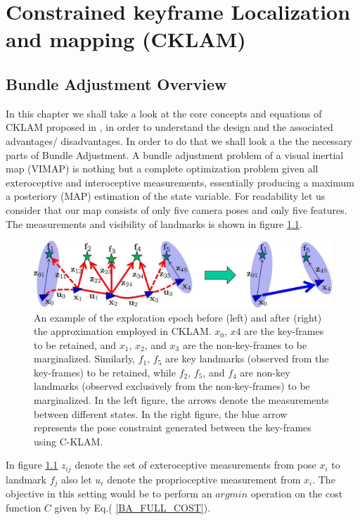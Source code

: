 \chapter{Constrained keyframe Localization and mapping (CKLAM)}
\label{sec:CKLAM}
\section{Bundle Adjustment Overview}
In this chapter we shall take a look at the core concepts and equations of CKLAM proposed in \cite{CKLAM}, in order to understand the design and the associated advantages/ disadvantages. In order to do that we shall look a the the necessary parts of Bundle Adjustment. 
A bundle adjustment problem of a visual inertial map (VIMAP) is nothing but a complete optimization problem given all exteroceptive and interoceptive measurements, essentially producing a maximum a posteriory (MAP) estimation of the state variable. For readability let us consider that our map consists of only five camera poses and only five features. The measurements and visibility of landmarks is shown in figure \ref{fig:CKLAM_BLOCK}. 

\begin{figure}[ht]
	\centering
		\includegraphics[width=1.00\textwidth]{images/cklam_block.png}
		\caption{An example of the exploration epoch before (left) and after (right) the approximation employed in CKLAM. $x_0$, $x4$ are the key-frames to be retained, and $x_1$, $x_2$, and $x_3$ are the non-key-frames to be marginalized. Similarly, $f_1$, $f_5$ are key landmarks (observed from the key-frames) to be retained, while $f_2$, $f_5$, and $f_4$ are non-key landmarks (observed exclusively from the non-key-frames) to be marginalized. In the left figure, the arrows denote the measurements between different states. In the right figure, the blue arrow represents the pose constraint generated between the key-frames using C-KLAM. \cite{CKLAM} }
	\label{fig:CKLAM_BLOCK}
\end{figure}

In figure \ref{fig:CKLAM_BLOCK} $z_{ij}$ denote the set of exteroceptive measurements from pose $x_i$ to landmark $f_j$ also let $u_i$ denote the proprioceptive measurement from $x_i$. The objective in this setting would be to perform an $argmin$ operation on the cost function $C$ given by Eq.( \ref{BA_FULL_COST}). 

